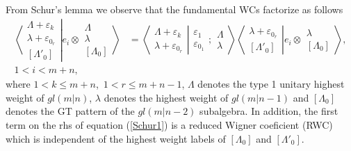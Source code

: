 \documentclass[12pt]{article}
\def\nn{\nonumber}
\begin{document}
From Schur's lemma we observe that the fundamental WCs factorize as follows
\begin{align}
\left\langle\left. 
\begin{array}{c} \Lambda+\varepsilon_k\\ \lambda+\varepsilon_{0_r} \\ {[\Lambda'_0]} \end{array}
\right|\right.
\left.
e_i\otimes \begin{array}{c} \Lambda \\ \lambda \\
{[\Lambda_0]} \end{array}
\right\rangle &= 
\left\langle\left. 
\begin{array}{c} \Lambda+\varepsilon_k\\ \lambda+\varepsilon_{0_r} 
 \end{array}
\right|\right.
\left.
\begin{array}{c} \varepsilon_1 \\ \varepsilon_{0_1} 
 \end{array}
; \begin{array}{c} \Lambda \\ \lambda
 \end{array}
\right\rangle 
\left\langle\left. 
\begin{array}{c} \lambda+\varepsilon_{0_r} \\ {[\Lambda'_0]} \end{array}
\right|\right.
\left.
e_i\otimes \begin{array}{c} \lambda \\
{[\Lambda_0]} \end{array}
\right\rangle,\label{Schur1}\\ 
1 < i < m+n, \nn
\end{align}
where $1 < k \leq m+n$,~$1 < r \leq m+n-1$, 
$\Lambda$ denotes the type 1 unitary highest weight of $gl(m|n)$, $\lambda$ denotes the highest weight of $gl(m|n-1)$ and $[\Lambda_0]$ denotes the GT pattern of the $gl(m|n-2)$ subalgebra. In addition, the first term on the rhs of equation (\ref{Schur1}) is a reduced Wigner coeficient (RWC) which is independent of the highest
weight labels of $[\Lambda_0]$ and $[\Lambda'_0]$.
\end{document}
